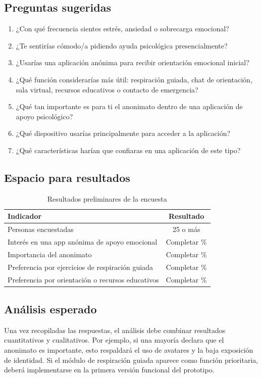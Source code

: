 \documentclass[12pt,letterpaper]{article}
\begin{document}
\subsection{Preguntas sugeridas}
\begin{enumerate}[leftmargin=*]
    \item ¿Con qué frecuencia sientes estrés, ansiedad o sobrecarga emocional?
    \item ¿Te sentirías cómodo/a pidiendo ayuda psicológica presencialmente?
    \item ¿Usarías una aplicación anónima para recibir orientación emocional inicial?
    \item ¿Qué función considerarías más útil: respiración guiada, chat de orientación, sala virtual, recursos educativos o contacto de emergencia?
    \item ¿Qué tan importante es para ti el anonimato dentro de una aplicación de apoyo psicológico?
    \item ¿Qué dispositivo usarías principalmente para acceder a la aplicación?
    \item ¿Qué características harían que confiaras en una aplicación de este tipo?
\end{enumerate}

\subsection{Espacio para resultados}
\begin{table}[H]
\centering
\caption{Resultados preliminares de la encuesta}
\begin{tabularx}{\textwidth}{X c}
\toprule
\textbf{Indicador} & \textbf{Resultado} \\
\midrule
Personas encuestadas & 25 o más \\
Interés en una app anónima de apoyo emocional & Completar \% \\
Importancia del anonimato & Completar \% \\
Preferencia por ejercicios de respiración guiada & Completar \% \\
Preferencia por orientación o recursos educativos & Completar \% \\
\bottomrule
\end{tabularx}
\end{table}

\subsection{Análisis esperado}
Una vez recopiladas las respuestas, el análisis debe combinar resultados cuantitativos y cualitativos. Por ejemplo, si una mayoría declara que el anonimato es importante, esto respaldará el uso de avatares y la baja exposición de identidad. Si el módulo de respiración guiada aparece como función prioritaria, deberá implementarse en la primera versión funcional del prototipo.
\end{document}
